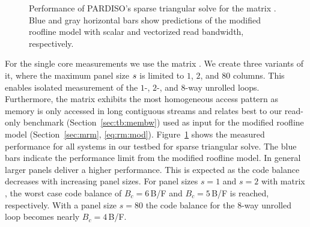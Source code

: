 \begin{figure}[tp]
{\label{fig:p:single-core:zen-s}
} %
  \caption{Performance of PARDISO's sparse triangular solve
    for the matrix . %
    Blue and gray horizontal bars show predictions of the modified roofline model 
    with scalar and vectorized read bandwidth, respectively.
    }%
  \label{fig:p:single-core}%
\end{figure}


For the single core measurements we use the matrix .
We create three variants of it, where the maximum panel size $s$ is
limited to $1$, $2$, and $80$ columns.
This enables isolated measurement of the $1$-, $2$-, and $8$-way
unrolled loops.
Furthermore, the matrix  exhibits the most homogeneous access pattern
as memory is only accessed in long contiguous streams and relates best to our
read-only benchmark (Section~\ref{sec:tb:membw}) used as input for the modified
roofline model (Section~\ref{sec:mrm}, \eqref{eq:rm:mod}).
%
Figure~\ref{fig:p:single-core} shows the measured performance for all systems in
our testbed for sparse triangular solve.
The blue bars indicate the performance limit from the modified roofline model.
%
In general larger panels deliver a higher performance.
This is expected as the code balance decreases with increasing panel sizes.
For panel sizes $s=1$ and $s=2$ with matrix , the worst case code balance
of $B_c=6$\,B/F and $B_c=5$\,B/F is reached, respectively. 
With a panel size $s=80$ the code balance for the $8$-way unrolled loop
becomes nearly $B_c=4$\,B/F.
  
